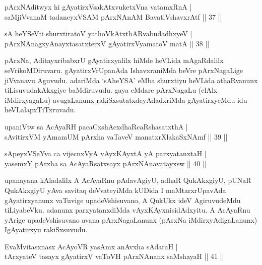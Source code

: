\begin{shl}
pArxNAditwyx hi gAyatirxVsakAtxvuketxVna vatamxRnA | \\
saMjiVvanaM tadaneyxVSAM pArxNAnAM BavatiVshavxrAtf \hfill ||  37 || 
\end{shl}

\begin{shl}
sA heYSeVti shurxtiratoV yathoVkAtxthARvabudadhxyeV  | \\
pArxNAnagxyAnayxtasatxterxV gAyatirxVyamatoV matA \hfill ||  38 || 
\end{shl}

\begin{artha} 
pArxNa, AditayxribabxrU gAyatirxyalilx hiMde heVLida mAgaRdalilx 
seVrikoMDiruvaru. gAyatirxVrUpanAda IshavxraniMda beVre pArxNagaLige 
jiVvanavu Aguvudu. adariMda `sAheYSA' eMba shurxtiyu heVLida 
athaRvanunx tiLisuvudakAkxgiye baMdiruvudu. gaya eMdare pArxNagaLu 
(elAlx iMdirxyagaLu) avugaLanunx rakiSxsutatxdeyAdadxriMda 
gAyatirxyeMdu idu heVLalapxTiTxruvadu.
\end{artha}


\begin{shl}
upaniVtw sa AcAyaRH pacaCxshAcxdhaRcaRshasatxthA | \\
sAvitirxVM yAmamUM pArxha vaTaveV manatxrXlakaSxNAmf \hfill ||  39 ||
\end{shl}

\begin{shl}
sA\s peyxVSeYva ca vijecnxVyA vAyxKAyxtA yA parxyatanxtaH | \\
yasemxY pArxha sa AcAyaRsatxsayx pArxNAnavatayxsw \hfill ||  40 || 
\end{shl}

\begin{artha} 
upanayana kAladalilx A AcAyaRnu pAdavAgiyU, adhaR QukAkxgiyU, pUNaR 
QukAkxgiyU yAva savitaq deVvateyiMda kUDida I maMtarxrUpavAda 
gAyatirxyanunx vaTuvige upadeVshisuvano, A QukUkx ideV AgiruvudeMdu 
tiLiyabeVku. adanunx parxyatanxdiMda vAyxKAyxnisidAdxyitu. A AcAyaRnu 
yArige upadeVshisuvano avana pArxNagaLanunx (pArxNa 
iMdirxyAdigaLanunx) I\break gAyatirxyu rakiSxsuvudu.
\end{artha}


\begin{shl}
EvaMvitasxnasx AcAyoVR yasAmx anAvxha sAdaraH | \\
tArxyateV tasayx gAyatirxV vaToVH pArxNAnanx saMshayaH \hfill ||  41 || 
\end{shl}

